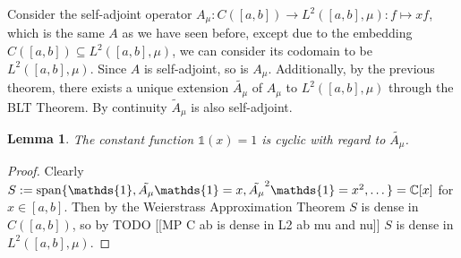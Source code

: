 \documentclass[12pt,oneside]{report}
\newtheorem{lem}[thm]{Lemma}
\begin{document}
Consider the self-adjoint operator $A_{\mu}: C([a,b]) \to L^{2}([a,b],\mu): f \mapsto xf$, which is the same $A$ as we have seen before, except due to the embedding $C([a,b]) \subseteq L^{2}([a,b],\mu)$, we can consider its codomain to be $L^{2}([a,b],\mu)$. Since $A$ is self-adjoint, so is $A_{\mu}$. Additionally, by the previous theorem, there exists a unique extension $\tilde{A_{\mu}}$ of $A_{\mu}$ to $L^{2}([a,b],\mu)$ through the BLT Theorem. By continuity $\tilde{A}_{\mu}$ is also self-adjoint.

\begin{lem}\label{cyclic-A}
    The constant function $\mathds{1}(x) = 1$ is cyclic with regard to $\tilde{A_{\mu}}$.
\end{lem}
\begin{proof}
    Clearly $S := \spanrm\{ \mathds{1}, \tilde{A_{\mu}}\mathds{1} = x, \tilde{A_{\mu}}^{2}\mathds{1} = x^{2}, \dots \} = \mathbb{C}[x]$ for $x \in [a,b]$. Then by the Weierstrass Approximation Theorem $S$ is dense in $C([a,b])$, so by TODO [[MP C ab is dense in L2 ab mu and nu]] $S$ is dense in $L^{2}([a,b],\mu)$.
\end{proof}
\end{document}
